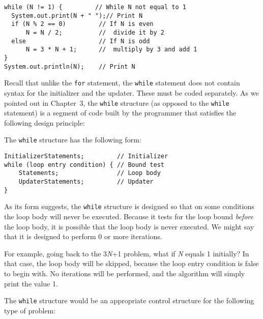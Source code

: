 \begin{jjjlisting}
\begin{lstlisting}
while (N != 1) {         // While N not equal to 1
  System.out.print(N + " ");// Print N
  if (N % 2 == 0)         // If N is even
      N = N / 2;          //  divide it by 2
  else                    // If N is odd
      N = 3 * N + 1;      //  multiply by 3 and add 1
}
System.out.println(N);    // Print N
\end{lstlisting}
\end{jjjlisting}

\noindent Recall that unlike the {\tt for} statement, the {\tt while} 
statement does not contain syntax for the initializer and the
updater. These must be coded separately. As we pointed out in
Chapter~3, the {\tt while} structure (as opposed to the {\tt while}
statement) is a segment of code built by the programmer that 
satisfies the following design principle:


\noindent The {\tt while} structure has the following form:
\begin{jjjlisting}
\begin{lstlisting}
InitializerStatements;         // Initializer
while (loop entry condition) { // Bound test
    Statements;                // Loop body
    UpdaterStatements;         // Updater
}
\end{lstlisting}
\end{jjjlisting}

\noindent As its form suggests, the {\tt while} structure is designed
so that on some conditions the loop body will never be
executed. Because it tests for the loop bound {\it before} the loop
body, it is possible that the loop body is never executed.  We might
say that it is designed to perform 0 or more iterations.

For example, going back to the 3{\it N}+1 problem, what if {\it N}
equals 1 initially? In that case, the loop body will be skipped,
because the loop entry condition is false to begin with. No iterations
will be performed, and the algorithm will simply print the value 1.

The {\tt while} structure would be an appropriate control structure
for the following type of problem:


